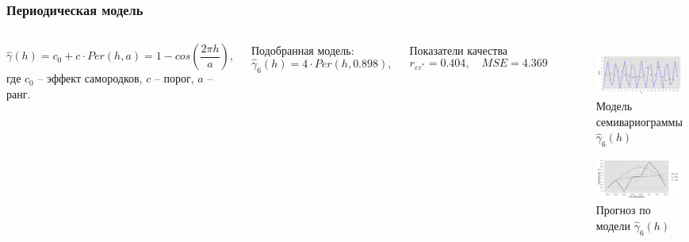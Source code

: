 \documentclass[10pt,pdf,aspectratio=169,hyperref={unicode}]{beamer}
\begin{document}
\begin{frame}
  \frametitle{Периодическая модель}
  \begin{columns}[c]
  \column{3in}
  \begin{equation}
  \label{eq:per}
    \widehat{\gamma}(h) = c_0 + c \cdot Per(h, a) = 1 - cos(\frac{2 \pi h}{a}),
  \end{equation}
  где $ c_0 $ -- эффект самородков, $ c $ -- порог, $ a $ -- ранг.

  \vspace{0.5em}

  Подобранная модель:
  \begin{equation}
  \label{eq:gamma6}
    \widehat{\gamma}_6(h) = 4 \cdot Per(h, 0.898),
  \end{equation}

  Показатели качества
  \begin{equation*}
    r_{\varepsilon\varepsilon^{*}} = 0.404, \quad MSE = 4.369
  \end{equation*}

  \column{3in}
  \vspace{-14.5pt}
  \begin{figure}[H]
    \includegraphics[width=0.9\linewidth]{../../figures/variogram/per-fit-cv-modeled.png} \\
    \caption{Модель семивариограммы $\widehat{\gamma}_6(h)$}
    \includegraphics[width=0.9\linewidth]{../../figures/variogram/per-fit-cv-cross-prediction.png}
    \caption{Прогноз по модели $\widehat{\gamma}_6(h)$}
  \end{figure}
  \end{columns}
\end{frame}
\end{document}
